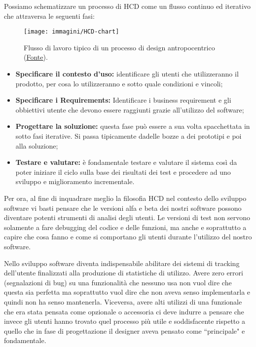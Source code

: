 Possiamo schematizzare un processo di HCD come un flusso continuo ed iterativo che attraversa le seguenti fasi:
\begin{figure}[!h]
	\centering
	\texttt{[image: immagini/HCD-chart]}
	\caption{Flusso di lavoro tipico di un processo di design antropocentrico
	(\href{https://www.usability.gov/what-and-why/user-centered-design.html}{\underline{Fonte}}).}
\end{figure}
\begin{itemize}
	\itemsep-0.3em
    \item \textbf{Specificare il contesto d'uso:} identificare gli utenti che utilizzeranno il prodotto, per cosa lo utilizzeranno e sotto quale
	condizioni e vincoli;
    \item \textbf{Specificare i Requirements:} Identificare i business requirement e gli obbiettivi utente che devono essere raggiunti grazie all'utilizzo
	del software;
    \item \textbf{Progettare la soluzione:} questa fase può essere a sua volta spacchettata in sotto fasi iterative. Si passa tipicamente dadelle bozze
	a dei prototipi e poi alla soluzione;
    \item \textbf{Testare e valutare:} è fondamentale testare e valutare il sistema così da poter iniziare il ciclo sulla base dei risultati dei
	test e procedere ad uno sviluppo e miglioramento incrementale.
\end{itemize}

Per ora, al fine di inquadrare meglio la filosofia HCD nel contesto dello sviluppo software vi basti pensare che le versioni alfa e beta dei nostri
software possono diventare potenti strumenti di analisi degli utenti. Le versioni di test non servono solamente a fare debugging del codice e
delle funzioni, ma anche e soprattutto a capire che cosa fanno e come si comportano gli utenti durante l'utilizzo del nostro software.

Nello sviluppo software diventa indispensabile abilitare dei sistemi di tracking dell'utente finalizzati alla produzione di statistiche di
utilizzo. Avere zero errori (segnalazioni di bug) su una funzionalità che nessuno usa non vuol dire che questa sia perfetta ma soprattutto vuol dire
che non aveva senso implementarla e quindi non ha senso mantenerla. Viceversa, avere alti utilizzi di una funzionale che era stata pensata come opzionale
o accessoria ci deve indurre a pensare che invece gli utenti hanno trovato quel processo più utile e soddisfacente rispetto a quello che in fase di
progettazione il designer aveva pensato come ``principale" e fondamentale.

